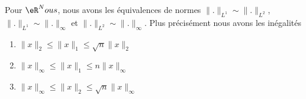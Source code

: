 \begin{proposition} \label{PropLJEJooMOWPNi}
    Pour \( \eR^Nous\), nous avons les équivalences de normes $\| . \|_{L^1}\sim\| . \|_{L^2}$, $\| . \|_{L^1}\sim\| . \|_{\infty}$ et $\| . \|_{L^2}\sim\| . \|_{\infty}$. Plus précisément nous avons les inégalités
    \begin{enumerate}
        \item\label{ItemABSGooQODmLNi}
           $ \| x \|_2\leq \| x \|_1\leq\sqrt{n}\| x \|_2$
        \item\label{ItemABSGooQODmLNii}
            $\| x \|_{\infty}\leq \| x \|_1\leq n \| x \|_{\infty}$
        \item\label{ItemABSGooQODmLNiii}
            $\| x \|_{\infty}\leq \| x \|_2\leq \sqrt{n}\| x \|_{\infty}$
    \end{enumerate}
\end{proposition}

